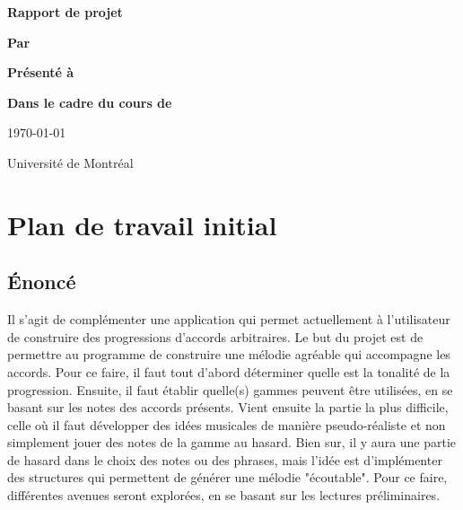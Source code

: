 \documentclass[letterpaper,12pt]{scrartcl}
\begin{document}
	\begin{center}
		\vspace{2cm}

		{\Huge\bf\sf Rapport de projet}
		\vspace{4cm}

		{\bf\sf Par}

		\vspace{0.5cm}{\large\bf\sf François Poitras}

		\vspace{2cm}

		{\bf\sf Présenté à}

		\vspace{0.5cm}{\large\bf\sf Olivier Bélanger et Sylvie Hamel}

		\vspace{2cm}

		{\bf\sf Dans le cadre du cours de}

		\vspace{0.5cm}{\large\bf\sf Projet d'informatique (IFT3150)}

		\vspace{\fill}
		
		\today

		\vspace{0.5cm}
		Université de Montréal
	\end{center}

	\newpage
	\pagestyle{plain}
	\section{Plan de travail initial}
	
	\subsection{Énoncé}
	Il s'agit de complémenter une application qui permet actuellement à l'utilisateur de construire des progressions d'accords arbitraires. Le but du projet est de permettre au programme de construire une mélodie agréable qui accompagne les accords. Pour ce faire, il faut tout d'abord déterminer quelle est la tonalité de la progression. Ensuite, il faut établir quelle(s) gammes peuvent être utilisées, en se basant sur les notes des accords présents. Vient ensuite la partie la plus difficile, celle où il faut développer des idées musicales de manière pseudo-réaliste et non simplement jouer des notes de la gamme au hasard. Bien sur, il y aura une partie de hasard dans le choix des notes ou des phrases, mais l'idée est d'implémenter des structures qui permettent de générer une mélodie "écoutable". Pour ce faire, différentes avenues seront explorées, en se basant sur les lectures préliminaires. 
\end{document}
